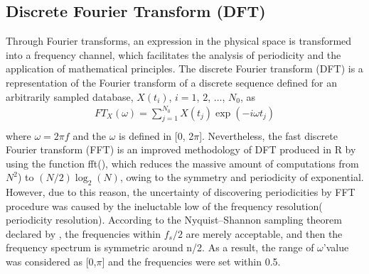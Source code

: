 \documentclass[12pt,msc]{uom_eee_dissertation_casson}
\begin{document}
\subsection{ Discrete Fourier Transform (DFT)}
\label{sec:dft}
Through Fourier transforms, an expression in the physical space is transformed into a frequency channel, which facilitates the analysis of periodicity and the application of mathematical principles. The discrete Fourier transform (DFT) is a representation of the Fourier transform of a discrete sequence defined for an arbitrarily sampled database, $X(t_{i})$, $i=1$, $2$, $\dots$, $N_{0}$, as
\begin{equation}
\label{eq:1-10}
\begin{aligned}
FT_{X}( \omega )=\sum_{j=1}^{N_{0}}X(t_{j})\exp(-i\omega t_{j})\\
\end{aligned}
\end{equation}
where $\omega=2\pi f$ and the $\omega$ is defined in [0, 2$\pi$]. Nevertheless, the fast discrete Fourier transform (FFT) is an improved methodology of DFT produced in R by using the function fft(), which reduces the massive amount of computations from $N^{2}$) to $(N/2)\log_{2}(N)$, owing to the symmetry and periodicity of exponential. However, due to this reason, the uncertainty of discovering periodicities by FFT procedure was caused by the ineluctable low of the frequency resolution( periodicity resolution). According to the Nyquist–Shannon sampling theorem declared by \citet{vaidyanathan2001generalizations}, the frequencies within $f_{s}/2$ are merely acceptable, and then the frequency spectrum is symmetric around n/2. As a result, the range of $\omega$'value was considered as [0,$\pi$] and the frequencies were set within 0.5. 
\end{document}
